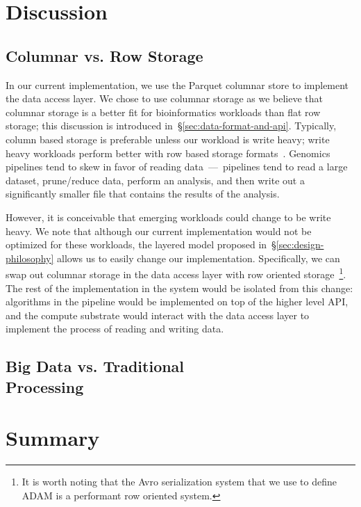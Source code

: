 \documentclass[10pt,twocolumn]{article}
\begin{document}
\section{Discussion}
\label{sec:discussion}

\subsection{Columnar vs. Row Storage}
\label{sec:columnar-vs-row-storage}

In our current implementation, we use the Parquet columnar store to implement the data access layer. We chose to use
columnar storage as we believe that columnar storage is a better fit for bioinformatics workloads than flat row storage;
this discussion is introduced in~\S\ref{sec:data-format-and-api}. Typically, column based storage is preferable unless
our workload is write heavy; write heavy workloads perform better with row based storage formats~\cite{stonebraker05}.
Genomics pipelines tend to skew in favor of reading data~---~pipelines tend to read a large dataset, prune/reduce data,
perform an analysis, and then write out a significantly smaller file that contains the results of the analysis.

However, it is conceivable that emerging workloads could change to be write heavy. We note that although our current
implementation would not be optimized for these workloads, the layered model proposed in~\S\ref{sec:design-philosophy}
allows us to easily change our implementation. Specifically, we can swap out columnar storage in the data access layer with
row oriented storage~\footnote{It is worth noting that the Avro serialization system that we use to define ADAM is a performant
row oriented system.}. The rest of the implementation in the system would be isolated from this change: algorithms in the
pipeline would be implemented on top of the higher level API, and the compute substrate would interact with the data access
layer to implement the process of reading and writing data. 

\subsection{Big Data vs. Traditional\\Processing}
\label{sec:big-data}

\section{Summary}
\label{sec:summary}
\end{document}
